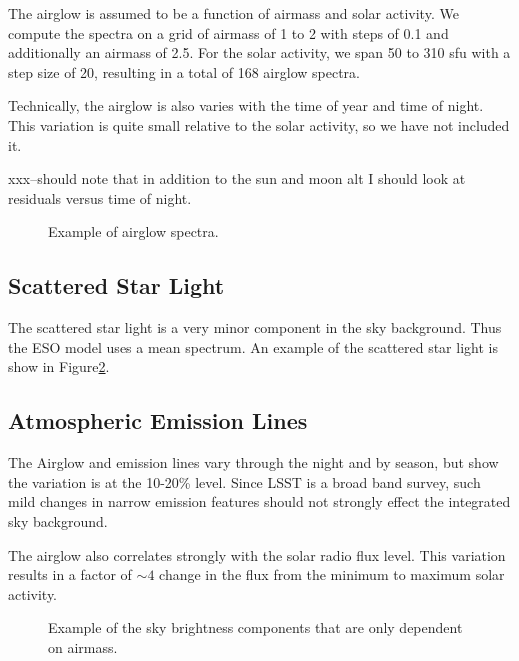 \documentclass{emulateapj}  %
\begin{document}
{The airglow is assumed to be a function of airmass and solar activity.  We compute the spectra on a grid of airmass of 1 to 2 with steps of 0.1 and additionally an airmass of 2.5.  For the solar activity, we span 50 to 310 sfu with a step size of 20, resulting in a total of 168 airglow spectra. 

Technically, the airglow is also varies with the time of year and time of night.  This variation is quite small relative to the solar activity\citet{Noll12}, so we have not included it.

xxx--should note that in addition to the sun and moon alt I should look at residuals versus time of night.

\begin{figure}
  \caption{Example of airglow spectra. \label{fig:airglow}}
\end{figure}

  

\subsection{Scattered Star Light}

The scattered star light is a very minor component in the sky background. Thus the ESO model uses a mean spectrum.  An example of the scattered star light is show in Figure\ref{fig:merged}.


\subsection{Atmospheric Emission Lines}

The Airglow and emission lines vary through the night and by season, but \citet{Noll12} show the variation is at the 10-20\% level.  Since LSST is a broad band survey, such mild changes in narrow emission features should not strongly effect the integrated sky background.

The airglow also correlates strongly with the solar radio flux level.  This variation results in a factor of $\sim4$ change in the flux from the minimum to maximum solar activity.  


\begin{figure}
  \caption{Example of the sky brightness components that are only dependent on airmass.  \label{fig:merged}}
\end{figure}


}
\end{document}
